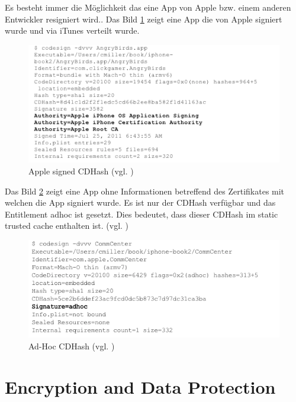 Es besteht immer die Möglichkeit das eine App von Apple bzw. einem anderen Entwickler resigniert wird.\cite{Sign[1], Sign[2], Sign[3], Sign[4], Sign[5]}. Das Bild  \ref{fig:Apple signed CDHash} zeigt eine App die von Apple signiert wurde und via iTunes verteilt wurde.

\begin{figure}[!ht]
        \centering
        \includegraphics[scale=1.0]{AppleZert_CDHash.png}
        \caption{Apple signed CDHash (vgl. \cite{Hacking[1]})}
        \label{fig:Apple signed CDHash}
\end{figure}

Das Bild \ref{fig:Ad-Hoc CDHash} zeigt eine App ohne Informationen betreffend des Zertifikates mit welchen die App signiert wurde. Es ist nur der CDHash verfügbar und das Entitlement adhoc ist gesetzt. Dies bedeutet, dass dieser CDHash im static trusted cache enthalten ist. (vgl. \cite{Sign[1], Sign[2], Sign[3], Sign[4], Sign[5]})

\begin{figure}[!ht]
        \centering
        \includegraphics[scale=0.9]{ADhoc_CDHash.png}
        \caption{Ad-Hoc CDHash (vgl. \cite{Hacking[1]})}
        \label{fig:Ad-Hoc CDHash}
\end{figure}

\section{Encryption and Data Protection}
\label{sec:EncryptionandDataProtection}

